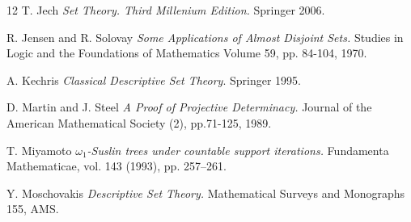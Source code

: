 \documentclass[a4paper,11pt]{article}
\begin{document}
\begin{thebibliography}{12}
 T. Jech \textit{Set Theory. Third Millenium Edition.} Springer 2006.

R. Jensen and R. Solovay \textit{Some Applications of Almost Disjoint Sets.}
Studies in Logic and the Foundations of Mathematics
Volume 59, pp. 84-104, 1970.



A. Kechris 
\textit{Classical Descriptive Set Theory}.  
Springer 1995.




 
  D. Martin and J. Steel \textit{A Proof of Projective Determinacy.} Journal of the American Mathematical Society (2), pp.71-125, 1989.
 
  T. Miyamoto {\em $\omega_1$-Suslin trees under countable support iterations.} Fundamenta Mathematicae,
vol. 143 (1993), pp. 257–261.



Y. Moschovakis \textit{Descriptive Set Theory.} Mathematical Surveys and Monographs 155, AMS.


\end{thebibliography}
\end{document}
